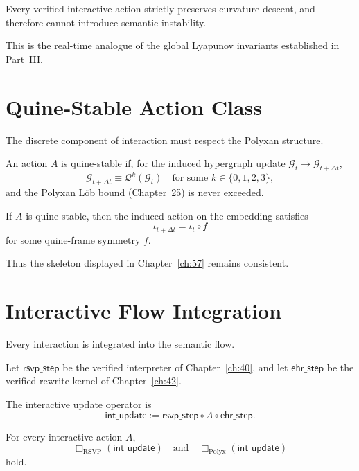 \begin{theorem}
Every verified interactive action strictly preserves curvature descent, and 
therefore cannot introduce semantic instability.
\end{theorem}

This is the real-time analogue of the global Lyapunov invariants established in
Part~III.

\section{Quine-Stable Action Class}
\label{sec:58:quine}

The discrete component of interaction must respect the Polyxan structure.

\begin{definition}
An action $A$ is quine-stable if, for the induced hypergraph update
$\mathcal{G}_t \to \mathcal{G}_{t+\Delta t}$,
\[
\mathcal{G}_{t+\Delta t} \equiv \mathcal{Q}^k(\mathcal{G}_t)
\quad\text{for some } k\in\{0,1,2,3\},
\]
and the Polyxan Löb bound (Chapter~25) is never exceeded.
\end{definition}

\begin{theorem}
If $A$ is quine-stable, then the induced action on the embedding satisfies
\[
\iota_{t+\Delta t} = \iota_t \circ f
\]
for some quine-frame symmetry $f$.
\end{theorem}

Thus the skeleton displayed in Chapter~\ref{ch:57} remains consistent.

\section{Interactive Flow Integration}
\label{sec:58:flow}

Every interaction is integrated into the semantic flow.

Let $\mathsf{rsvp\_step}$ be the verified interpreter of Chapter~\ref{ch:40}, 
and let $\mathsf{ehr\_step}$ be the verified rewrite kernel of 
Chapter~\ref{ch:42}.

\begin{definition}
The interactive update operator is
\[
\mathsf{int\_update} 
:= \mathsf{rsvp\_step} \circ A \circ \mathsf{ehr\_step}.
\]
\end{definition}

\begin{theorem}
For every interactive action $A$,
\[
\Box_{\mathrm{RSVP}}(\mathsf{int\_update})
\quad\text{and}\quad
\Box_{\mathrm{Polyx}}(\mathsf{int\_update})
\]
hold.
\end{theorem}

